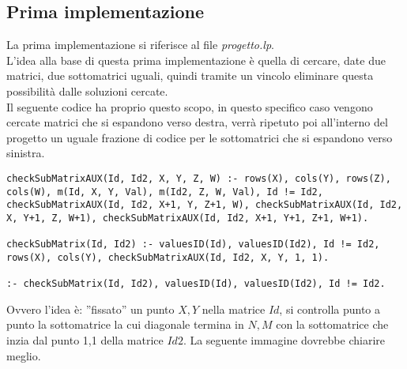 \documentclass{article}
\begin{document}
\subsection*{Prima implementazione}
La prima implementazione si riferisce al file \textit{progetto.lp}.\\
L'idea alla base di questa prima implementazione è quella di cercare, date due matrici, due sottomatrici uguali, quindi tramite un vincolo eliminare questa possibilità dalle soluzioni cercate.\\
Il seguente codice ha proprio questo scopo, in questo specifico caso vengono cercate matrici che si espandono verso destra, verrà ripetuto poi all'interno del progetto un uguale frazione di codice per le sottomatrici che si espandono verso sinistra.\\

\begin{lstlisting}
checkSubMatrixAUX(Id, Id2, X, Y, Z, W) :- rows(X), cols(Y), rows(Z), cols(W), m(Id, X, Y, Val), m(Id2, Z, W, Val), Id != Id2, checkSubMatrixAUX(Id, Id2, X+1, Y, Z+1, W), checkSubMatrixAUX(Id, Id2, X, Y+1, Z, W+1), checkSubMatrixAUX(Id, Id2, X+1, Y+1, Z+1, W+1).

checkSubMatrix(Id, Id2) :- valuesID(Id), valuesID(Id2), Id != Id2, rows(X), cols(Y), checkSubMatrixAUX(Id, Id2, X, Y, 1, 1).

:- checkSubMatrix(Id, Id2), valuesID(Id), valuesID(Id2), Id != Id2.
\end{lstlisting}

Ovvero l'idea è: ''fissato'' un punto $X,Y$ nella matrice $Id$, si controlla punto a punto la sottomatrice la cui diagonale termina in $N,M$ con la sottomatrice che inzia dal punto 1,1 della matrice $Id2$. La seguente immagine dovrebbe chiarire meglio.
\end{document}
